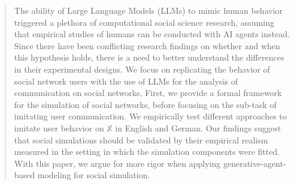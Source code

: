 \begin{abstract}
The ability of Large Language Models (LLMs) to mimic human behavior triggered a plethora of computational social science research, assuming that empirical studies of humans can be conducted with AI agents instead. Since there have been conflicting research findings on whether and when this hypothesis holds, there is a need to better understand the differences in their experimental designs. We focus on replicating the behavior of social network users with the use of LLMs for the analysis of communication on social networks. First, we provide a formal framework for the simulation of social networks, before focusing on the sub-task of imitating user communication. We empirically test different approaches to imitate user behavior on $\mathbb{X}$ in English and German. Our findings suggest that social simulations should be validated by their empirical realism measured in the setting in which the simulation components were fitted. With this paper, we argue for more rigor when applying generative-agent-based modeling for social simulation.
\end{abstract}